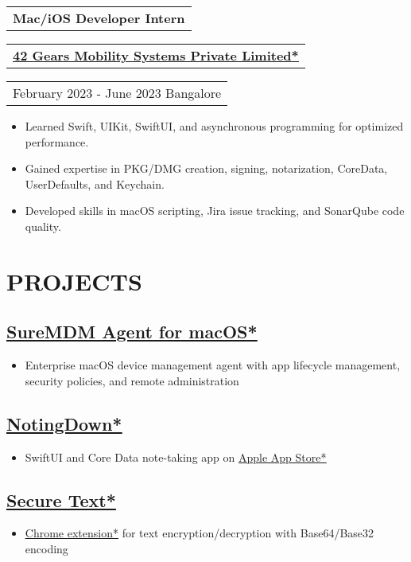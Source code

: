 \documentclass[10pt,a4paper]{moderncv}
\let\oldhref\href
\renewcommand{\href}[2]{\oldhref{#1}{\underline{#2}}}
\newcommand*{\experienceentry}[5][1.5mm]{
    \begin{tabularx}{\textwidth}{L}
        {\bfseries\large #2}
    \end{tabularx}
    \vspace{1mm}
    \begin{tabularx}{\textwidth}{L}
        {\bfseries #3}
    \end{tabularx}
    \vspace{1mm}
    \begin{tabularx}{\textwidth}{L}
        {\faCalendar\enspace #4 \faMapMarker\enspace #5}
    \end{tabularx}
    \par\addvspace{#1}
}
\begin{document}
\begin{minipage}[t]{0.60\textwidth}
\noindent\makebox[\linewidth]{\dotfill}
\vspace{2.0mm}

\experienceentry{Mac/iOS Developer Intern}{\href{https://www.42gears.com/}{42 Gears Mobility Systems Private Limited*}}{February 2023 - June 2023}{Bangalore}

\begin{itemize}
    \item Learned Swift, UIKit, SwiftUI, and asynchronous programming for optimized performance.
    \item Gained expertise in PKG/DMG creation, signing, notarization, CoreData, UserDefaults, and Keychain.
    \item Developed skills in macOS scripting, Jira issue tracking, and SonarQube code quality.
\end{itemize}

\section{PROJECTS}
\subsection{\href{https://www.42gears.com/products/mobile-device-management/suremdm-agent-for-macos-past-releases/}{SureMDM Agent for macOS*}}
\begin{itemize}
    \item Enterprise macOS device management agent with app lifecycle management, security policies, and remote administration
\end{itemize}

\subsection{\href{https://github.com/sachin6174/NotingDown}{NotingDown*}}
\begin{itemize}
    \item SwiftUI and Core Data note-taking app on \href{https://apps.apple.com/us/app/notingdown/id123456789}{Apple App Store*}
\end{itemize}

\subsection{\href{https://github.com/sachin6174/secure-text-chrome-extension}{Secure Text*}}
\begin{itemize}
    \item \href{https://chromewebstore.google.com/detail/secure-text/ankgchfieiimiijhlcjcongijapefmei}{Chrome extension*} for text encryption/decryption with Base64/Base32 encoding
\end{itemize}


\end{minipage}
\end{document}
